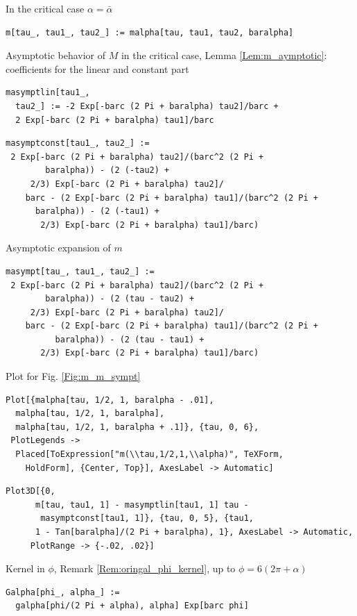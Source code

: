 \documentclass[reqno]{amsart}
\theoremstyle{definition} \newtheorem{definition}{Definition}[section]
\theoremstyle{definition} \newtheorem{remark}[definition]{Remark}
\theoremstyle{plain} \newtheorem{lemma}[definition]{Lemma}
\theoremstyle{plain} \newtheorem{proposition}[definition]{Proposition}
\theoremstyle{plain} \newtheorem{theorem}[definition]{Theorem}
\theoremstyle{plain} \newtheorem{corollary}[definition]{Corollary}
\theoremstyle{definition} \newtheorem{example}[definition]{Example}
\theoremstyle{plain} \newtheorem{claim}[clai]{Claim}
\theoremstyle{definition} \newtheorem{assumption}[definition]{Assumption}
\theoremstyle{definition} \newtheorem{observation}[definition]{Observation}
\newcommand{\1}{\mathbbm 1}
\numberwithin{equation}{section} %
\theoremstyle{plain} \newtheorem*{theorem*}{Theorem}
\theoremstyle{plain} \newtheorem{mthm}[maintheorem]{Main Theorem}
\theoremstyle{plain} \newtheorem*{mthm*}{Main Theorem}
\theoremstyle{plain} \newtheorem*{conjecture*}{Conjecture}
\theoremstyle{plain} \newtheorem{conjecture}[definition]{Conjecture}
\theoremstyle{plain} \newtheorem*{problem*}{Problem}
\begin{document}
\medskip
In the critical case $\alpha = \bar \alpha$
\medskip
\begin{verbatim}
m[tau_, tau1_, tau2_] := malpha[tau, tau1, tau2, baralpha]
\end{verbatim}
\medskip
Asymptotic behavior of $M$ in the critical case, Lemma \ref{Lem:m_aymptotic}: coefficients for the linear and constant part
\medskip
\begin{verbatim}
masymptlin[tau1_, 
  tau2_] := -2 Exp[-barc (2 Pi + baralpha) tau2]/barc + 
  2 Exp[-barc (2 Pi + baralpha) tau1]/barc
\end{verbatim}
\begin{verbatim}
masymptconst[tau1_, tau2_] := 
 2 Exp[-barc (2 Pi + baralpha) tau2]/(barc^2 (2 Pi + 
        baralpha)) - (2 (-tau2) + 
     2/3) Exp[-barc (2 Pi + baralpha) tau2]/
    barc - (2 Exp[-barc (2 Pi + baralpha) tau1]/(barc^2 (2 Pi + 
      baralpha)) - (2 (-tau1) + 
       2/3) Exp[-barc (2 Pi + baralpha) tau1]/barc)
\end{verbatim}
\medskip
Asymptotic expansion of $m$
\medskip
\begin{verbatim}
masympt[tau_, tau1_, tau2_] := 
 2 Exp[-barc (2 Pi + baralpha) tau2]/(barc^2 (2 Pi + 
        baralpha)) - (2 (tau - tau2) + 
     2/3) Exp[-barc (2 Pi + baralpha) tau2]/
    barc - (2 Exp[-barc (2 Pi + baralpha) tau1]/(barc^2 (2 Pi + 
          baralpha)) - (2 (tau - tau1) + 
       2/3) Exp[-barc (2 Pi + baralpha) tau1]/barc)
\end{verbatim}
\medskip
Plot for Fig. \ref{Fig:m_m_sympt}
\medskip
\begin{verbatim}
Plot[{malpha[tau, 1/2, 1, baralpha - .01], 
  malpha[tau, 1/2, 1, baralpha], 
  malpha[tau, 1/2, 1, baralpha + .1]}, {tau, 0, 6}, 
 PlotLegends -> 
  Placed[ToExpression["m(\\tau,1/2,1,\\alpha)", TeXForm, 
    HoldForm], {Center, Top}], AxesLabel -> Automatic]
\end{verbatim}
\begin{verbatim}
Plot3D[{0, 
      m[tau, tau1, 1] - masymptlin[tau1, 1] tau - 
       masymptconst[tau1, 1]}, {tau, 0, 5}, {tau1, 
      1 - Tan[baralpha]/(2 Pi + baralpha), 1}, AxesLabel -> Automatic, 
     PlotRange -> {-.02, .02}]
\end{verbatim}
\medskip
Kernel in $\phi$, Remark \ref{Rem:oringal_phi_kernel}, up to $\phi = 6(2\pi+\alpha)$
\medskip
\begin{verbatim}
Galpha[phi_, alpha_] := 
  galpha[phi/(2 Pi + alpha), alpha] Exp[barc phi]
\end{verbatim}
\end{document}
